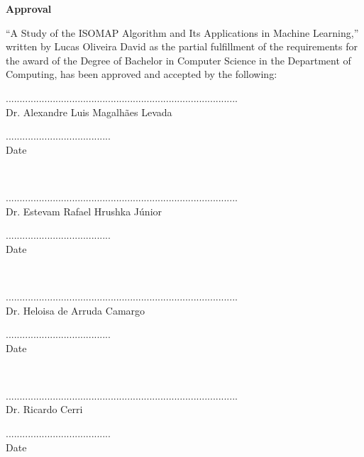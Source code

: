 \begin{center}
	\textbf{Approval}
\end{center}

“A Study of the ISOMAP Algorithm and Its Applications in Machine Learning,” written by Lucas Oliveira David as the partial fulfillment of the requirements for the award of the Degree of Bachelor  in Computer Science in the Department of Computing, has been approved and accepted by the following:

\vfill

\begin{minipage}{.7\linewidth}
	....................................................................................\\
	Dr. Alexandre Luis Magalhães Levada
\end{minipage}%
\begin{minipage}{.3\linewidth}
	\begin{flushright}
		......................................\\
		Date
	\end{flushright}
\end{minipage}\\[1.5cm]

\begin{minipage}{.7\linewidth}
	....................................................................................\\
	Dr. Estevam Rafael Hrushka Júnior
\end{minipage}%
\begin{minipage}{.3\linewidth}
	\begin{flushright}
		......................................\\
		Date
	\end{flushright}
\end{minipage}\\[1.5cm]

\begin{minipage}{.7\linewidth}
	....................................................................................\\
	Dr. Heloisa de Arruda Camargo
\end{minipage}%
\begin{minipage}{.3\linewidth}
	\begin{flushright}
		......................................\\
		Date
	\end{flushright}
\end{minipage}\\[1.5cm]

\begin{minipage}{.7\linewidth}
	....................................................................................\\
	Dr. Ricardo Cerri
\end{minipage}%
\begin{minipage}{.3\linewidth}
	\begin{flushright}
		......................................\\
		Date
	\end{flushright}
\end{minipage}

